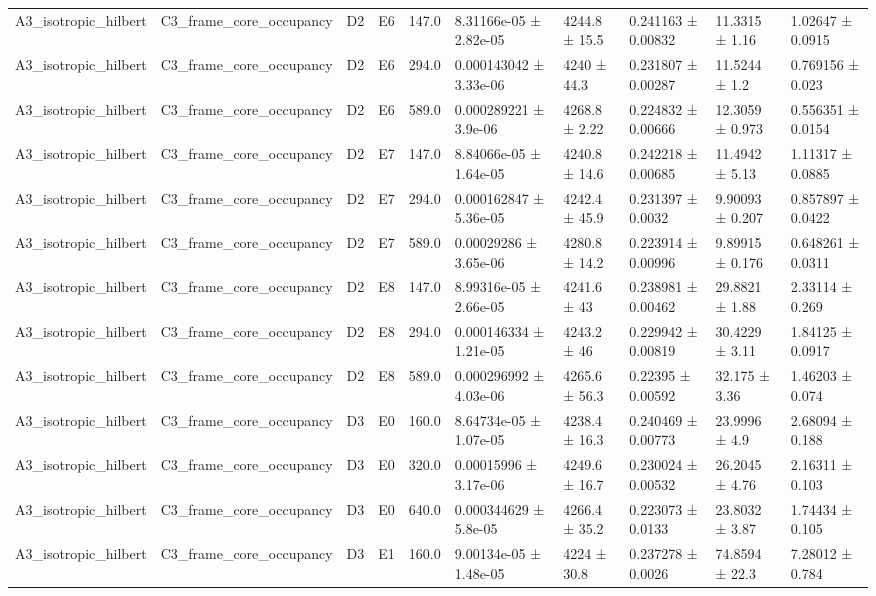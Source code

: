 \begin{table}
\begin{tabular}{llllllllll}
A3\_isotropic\_hilbert & C3\_frame\_core\_occupancy & D2 & E6 & 147.0 & 8.31166e-05 ± 2.82e-05 & 4244.8 ± 15.5 & 0.241163 ± 0.00832 & 11.3315 ± 1.16 & 1.02647 ± 0.0915 \\
A3\_isotropic\_hilbert & C3\_frame\_core\_occupancy & D2 & E6 & 294.0 & 0.000143042 ± 3.33e-06 & 4240 ± 44.3 & 0.231807 ± 0.00287 & 11.5244 ± 1.2 & 0.769156 ± 0.023 \\
A3\_isotropic\_hilbert & C3\_frame\_core\_occupancy & D2 & E6 & 589.0 & 0.000289221 ± 3.9e-06 & 4268.8 ± 2.22 & 0.224832 ± 0.00666 & 12.3059 ± 0.973 & 0.556351 ± 0.0154 \\
A3\_isotropic\_hilbert & C3\_frame\_core\_occupancy & D2 & E7 & 147.0 & 8.84066e-05 ± 1.64e-05 & 4240.8 ± 14.6 & 0.242218 ± 0.00685 & 11.4942 ± 5.13 & 1.11317 ± 0.0885 \\
A3\_isotropic\_hilbert & C3\_frame\_core\_occupancy & D2 & E7 & 294.0 & 0.000162847 ± 5.36e-05 & 4242.4 ± 45.9 & 0.231397 ± 0.0032 & 9.90093 ± 0.207 & 0.857897 ± 0.0422 \\
A3\_isotropic\_hilbert & C3\_frame\_core\_occupancy & D2 & E7 & 589.0 & 0.00029286 ± 3.65e-06 & 4280.8 ± 14.2 & 0.223914 ± 0.00996 & 9.89915 ± 0.176 & 0.648261 ± 0.0311 \\
A3\_isotropic\_hilbert & C3\_frame\_core\_occupancy & D2 & E8 & 147.0 & 8.99316e-05 ± 2.66e-05 & 4241.6 ± 43 & 0.238981 ± 0.00462 & 29.8821 ± 1.88 & 2.33114 ± 0.269 \\
A3\_isotropic\_hilbert & C3\_frame\_core\_occupancy & D2 & E8 & 294.0 & 0.000146334 ± 1.21e-05 & 4243.2 ± 46 & 0.229942 ± 0.00819 & 30.4229 ± 3.11 & 1.84125 ± 0.0917 \\
A3\_isotropic\_hilbert & C3\_frame\_core\_occupancy & D2 & E8 & 589.0 & 0.000296992 ± 4.03e-06 & 4265.6 ± 56.3 & 0.22395 ± 0.00592 & 32.175 ± 3.36 & 1.46203 ± 0.074 \\
A3\_isotropic\_hilbert & C3\_frame\_core\_occupancy & D3 & E0 & 160.0 & 8.64734e-05 ± 1.07e-05 & 4238.4 ± 16.3 & 0.240469 ± 0.00773 & 23.9996 ± 4.9 & 2.68094 ± 0.188 \\
A3\_isotropic\_hilbert & C3\_frame\_core\_occupancy & D3 & E0 & 320.0 & 0.00015996 ± 3.17e-06 & 4249.6 ± 16.7 & 0.230024 ± 0.00532 & 26.2045 ± 4.76 & 2.16311 ± 0.103 \\
A3\_isotropic\_hilbert & C3\_frame\_core\_occupancy & D3 & E0 & 640.0 & 0.000344629 ± 5.8e-05 & 4266.4 ± 35.2 & 0.223073 ± 0.0133 & 23.8032 ± 3.87 & 1.74434 ± 0.105 \\
A3\_isotropic\_hilbert & C3\_frame\_core\_occupancy & D3 & E1 & 160.0 & 9.00134e-05 ± 1.48e-05 & 4224 ± 30.8 & 0.237278 ± 0.0026 & 74.8594 ± 22.3 & 7.28012 ± 0.784 \\

\end{tabular}
\end{table}
